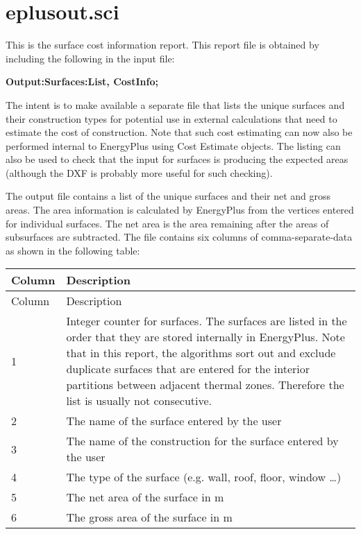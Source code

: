 \section{eplusout.sci}\label{eplusout.sci}

This is the surface cost information report. This report file is obtained by including the following in the input file:

\textbf{Output:Surfaces:List, CostInfo;}

The intent is to make available a separate file that lists the unique surfaces and their construction types for potential use in external calculations that need to estimate the cost of construction. Note that such cost estimating can now also be performed internal to EnergyPlus using Cost Estimate objects. The listing can also be used to check that the input for surfaces is producing the expected areas (although the DXF is probably more useful for such checking).

The output file contains a list of the unique surfaces and their net and gross areas. The area information is calculated by EnergyPlus from the vertices entered for individual surfaces. The net area is the area remaining after the areas of subsurfaces are subtracted. The file contains six columns of comma-separate-data as shown in the following table:

\begin{longtable}[c]{p{1.5in}p{4.5in}}
\toprule 
Column & Description \tabularnewline
\midrule
\endfirsthead

\toprule 
Column & Description \tabularnewline
\midrule
\endhead

1 & Integer counter for surfaces. The surfaces are listed in the order that they are stored internally in EnergyPlus. Note that in this report, the algorithms sort out and exclude duplicate surfaces that are entered for the interior partitions between adjacent thermal zones. Therefore the list is usually not consecutive. \tabularnewline
2 & The name of the surface entered by the user \tabularnewline
3 & The name of the construction for the surface entered by the user \tabularnewline
4 & The type of the surface (e.g. wall, roof, floor, window …) \tabularnewline
5 & The net area of the surface in m \tabularnewline
6 & The gross area of the surface in m \tabularnewline
\bottomrule
\end{longtable}
